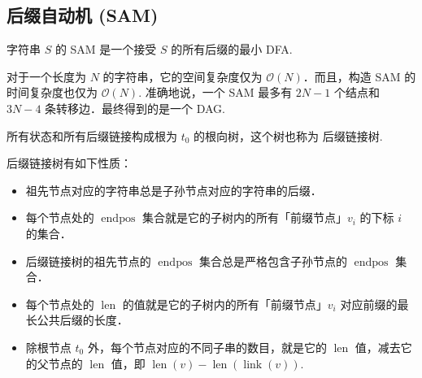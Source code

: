 \subsection{后缀自动机 (SAM)}
字符串 $S$ 的 SAM 是一个接受 $S$ 的所有后缀的最小 DFA.

对于一个长度为 $N$ 的字符串，它的空间复杂度仅为 $\mathcal O(N)$．而且，构造 SAM 的时间复杂度也仅为 $\mathcal O(N)$.
准确地说，一个 SAM 最多有 $2N - 1$ 个结点和 $3N - 4$ 条转移边．最终得到的是一个 DAG.

所有状态和所有后缀链接构成根为 $t_0$ 的根向树，这个树也称为 后缀链接树.

后缀链接树有如下性质：

\begin{itemize}
    \item 祖先节点对应的字符串总是子孙节点对应的字符串的后缀．
    \item 每个节点处的 $\operatorname{endpos}$ 集合就是它的子树内的所有「前缀节点」$v_i$ 的下标 $i$ 的集合．
    \item 后缀链接树的祖先节点的 $\operatorname{endpos}$ 集合总是严格包含子孙节点的 $\operatorname{endpos}$ 集合．
    \item  每个节点处的 $\operatorname{len}$ 的值就是它的子树内的所有「前缀节点」$v_i$ 对应前缀的最长公共后缀的长度．
    \item 除根节点 $t_0$ 外，每个节点对应的不同子串的数目，就是它的 $\operatorname{len}$ 值，减去它的父节点的 $\operatorname{len}$ 值，即 $\operatorname{len}(v)-\operatorname{len}(\operatorname{link}(v))$.
\end{itemize}

